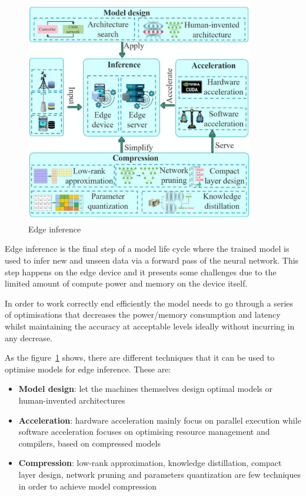 \begin{figure}[ht]
    \includegraphics[width=10cm]{images/introduction/edge_inference.png}
    \centering
    \caption{Edge inference}\label{fig:edge_inference}
\end{figure}

Edge inference is the final step of a model life cycle where the trained model
is used to infer new and unseen data via a forward pass of the neural network.
This step happens on the edge device and it presents some challenges due to the
limited amount of compute power and memory on the device itself.

In order to work correctly end efficiently the model needs to go through a
series of optimisations that decreases the power/memory consumption and latency
whilst maintaining the accuracy at acceptable levels \- ideally without
incurring in any decrease.

As the figure~\ref{fig:edge_inference} shows, there are different techniques
that it can be used to optimise models for edge inference. These are:
\begin{itemize}
    \item \textbf{Model design}: let the machines themselves design optimal
        models or human-invented architectures
    \item \textbf{Acceleration}: hardware acceleration mainly focus on parallel
        execution while software acceleration focuses on optimising resource
        management and compilers, based on compressed models
    \item \textbf{Compression}: low-rank approximation, knowledge distillation,
        compact layer design, network pruning and parameters quantization are
        few techniques in order to achieve model compression
\end{itemize}

